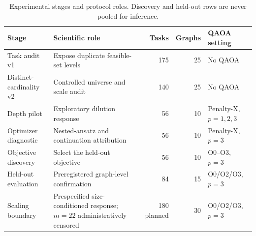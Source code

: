 
\begin{table}[t]
\centering
\caption{Experimental stages and protocol roles. Discovery and held-out rows are never pooled for inference.}
\label{tab:protocol-summary}
\small
\begin{tabularx}{\textwidth}{@{}lXrrl@{}}
\toprule
Stage & Scientific role & Tasks & Graphs & QAOA setting \\
\midrule
Task audit v1 & Expose duplicate feasible-set levels & 175 & 25 & No QAOA \\
Distinct-cardinality v2 & Controlled universe and scale audit & 140 & 25 & No QAOA \\
Depth pilot & Exploratory dilution response & 56 & 10 & Penalty-X, $p=1,2,3$ \\
Optimizer diagnostic & Nested-ansatz and continuation attribution & 56 & 10 & Penalty-X, $p=3$ \\
Objective discovery & Select the held-out objective & 56 & 10 & O0--O3, $p=3$ \\
Held-out evaluation & Preregistered graph-level confirmation & 84 & 15 & O0/O2/O3, $p=3$ \\
Scaling boundary & Prespecified size-conditioned response; $m=22$ administratively censored & 180 planned & 30 & O0/O2/O3, $p=3$ \\
\bottomrule
\end{tabularx}
\end{table}
